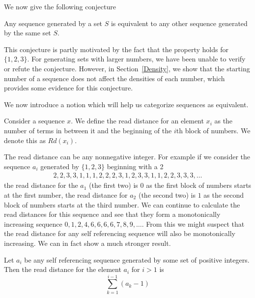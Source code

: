 \documentclass[runningheads,a4paper]{llncs}
\begin{document}
We now give the following conjecture

\begin{conjecture} Any sequence generated by a set $S$ is equivalent to any other sequence generated by the same set $S$.
\end{conjecture}

This conjecture is partly motivated by the fact that the property holds for $\{1,2,3\}$. For generating sets with larger numbers, we have been unable to verify or refute the conjecture. However, in Section~\ref{Density}, we show that the starting number of a sequence does not affect the densities of each number, which provides some evidence for this conjecture.

We now introduce a notion which will help us categorize sequences as equivalent. 
\begin{definition} Consider a sequence $x$. We define the read distance for an element $x_i$ as the number of terms in between it and the beginning of the $i$th block of numbers. We denote this as $Rd(x_i)$. 
\end{definition}
The read distance can be any nonnegative integer. For example if we consider the sequence $a_i$ generated by $\{1,2,3\}$ beginning with a 2  
\begin{align*}
2,2,3,3,1,1,1,2,2,2,3,1,2,3,3,1,1,2,2,3,3,3,\dots
\end{align*}
the read distance for the $a_1$ (the first two) is $0$ as the first block of numbers starts at the first number, the read distance for $a_2$ (the second two) is $1$ as the second block of numbers starts at the third number. We can continue to calculate the read distances for this sequence and see that they form a monotonically increasing sequence $0,1,2,4,6,6,6,6,7,8,9,\ldots$. From this we might suspect that the read distance for any self referencing sequence will also be monotonically increasing. We can in fact show a much stronger result. 
\begin{lemma} 
\label{readdistformula}
Let $a_i$ be any self referencing sequence generated by some set of positive integers. Then the read distance for the element $a_i$ for $i>1$ is 
\begin{equation*}
\sum_{k=1}^{i-1}( a_k - 1)
\end{equation*} 
\end{lemma}
\end{document}
